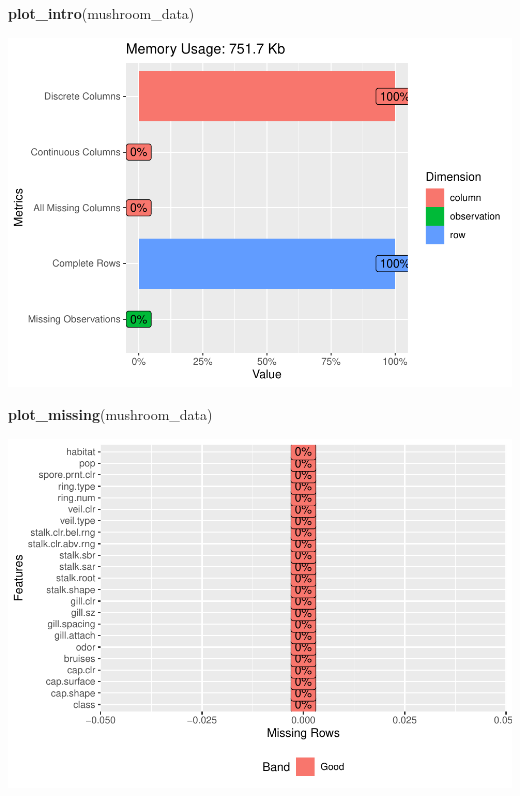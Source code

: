 \documentclass[
  english,
  man]{apa6}
\newenvironment{Shaded}{\begin{snugshade}}{\end{snugshade}}
\newcommand{\KeywordTok}[1]{\textcolor[rgb]{0.13,0.29,0.53}{\textbf{#1}}}
\newcommand{\NormalTok}[1]{#1}
\begin{document}
\begin{Shaded}
\begin{Highlighting}[]
\KeywordTok{plot_intro}\NormalTok{(mushroom_data)}
\end{Highlighting}
\end{Shaded}

\includegraphics{MSDS680-Week-5-SVM-and-ANNRmd_files/figure-latex/data exploration-1.pdf}

\begin{Shaded}
\begin{Highlighting}[]
\KeywordTok{plot_missing}\NormalTok{(mushroom_data)}
\end{Highlighting}
\end{Shaded}

\includegraphics{MSDS680-Week-5-SVM-and-ANNRmd_files/figure-latex/data exploration-2.pdf}
\end{document}
